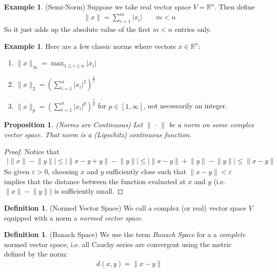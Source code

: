 \documentclass[12pt]{article}
\numberwithin{equation}{section} %
\theoremstyle{plain}
\newtheorem{prop}[thm]{Proposition}
\theoremstyle{definition}
\newtheorem{defn}[thm]{Definition}
\newtheorem{ex}[thm]{Example}
\theoremstyle{remark}
\newcommand{\Rn}{\mathbb{R}^n}
\begin{document}
\begin{ex}(Semi-Norm)
Suppose we take real vector space $V=\Rn$. Then define
\begin{align*}
  \lVert x\rVert = \sum_{i=1}^m |x_i|
  \qquad m < n
\end{align*}
So it just adds up the absolute value of the first $m<n$ entries only.
\end{ex}

\begin{ex}
Here are a few classic norms where vectors $x\in \Rn$:
\begin{enumerate}
\item $\lVert x\rVert_\infty = \max_{1\leq i\leq n} |x_i|$
\item $\lVert x\rVert_2 = \left(\sum_{i=1}^n |x_i|^2\right)^{\frac{1}{2}}$
\item $\lVert x\rVert_p = \left(\sum_{i=1}^n
  |x_i|^p\right)^{\frac{1}{p}}$ for $p\in[1,\infty]$, not necessarily an
  integer.
\end{enumerate}
\end{ex}

\begin{prop}\emph{(Norms are Continuous)}
Let $\lVert \,\cdot\,\rVert$ be a norm on some complex vector space.
That norm is a (Lipschitz) continuous function.
\end{prop}
\begin{proof}
Notice that
\begin{align*}
    \big\lvert \lVert x \rVert - \lVert y\rVert \big\rvert
    \leq
    \big\lvert \lVert x - y + y\rVert - \lVert y\rVert \big\rvert
    \leq
    \big\lvert \lVert x - y \rVert + \lVert y\rVert - \lVert y\rVert \big\rvert
    \leq
    \lVert x - y \rVert
\end{align*}
So given $\varepsilon>0$, choosing $x$ and $y$ sufficiently close such
that $\lVert x-y\rVert<\varepsilon$ implies that the distance between
the function evaluated at $x$ and $y$ (i.e.
$\lVert x\rVert- \lVert y\rVert$) is sufficiently small.
\end{proof}

\begin{defn}(Normed Vector Space)
We call a complex (or real) vector space $V$ equipped with a norm a
\emph{normed vector space}.
\end{defn}


\begin{defn}(Banach Space)
We use the term \emph{Banach Space} for a a \emph{complete} normed
vector space, i.e. all Cauchy series are convergent using the metric
defined by the norm:
\begin{align*}
  d(x,y) = \lVert x-y\rVert
\end{align*}
\end{defn}
\end{document}

